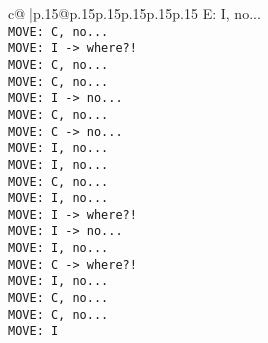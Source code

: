 \documentclass{article}
\begin{document}
{\begin{supertabular}{c@{$\;$}|p{.15\linewidth}@{}p{.15\linewidth}p{.15\linewidth}p{.15\linewidth}p{.15\linewidth}p{.15\linewidth}}
{{{E: I, no...\\ \tt  MOVE: C, no...\\ \tt  MOVE: I -> where?!\\ \tt  MOVE: C, no...\\ \tt  MOVE: C, no...\\ \tt  MOVE: I -> no...\\ \tt  MOVE: C, no...\\ \tt  MOVE: C -> no...\\ \tt  MOVE: I, no...\\ \tt  MOVE: I, no...\\ \tt  MOVE: C, no...\\ \tt  MOVE: I, no...\\ \tt  MOVE: I -> where?!\\ \tt  MOVE: I -> no...\\ \tt  MOVE: I, no...\\ \tt  MOVE: C -> where?!\\ \tt  MOVE: I, no...\\ \tt  MOVE: C, no...\\ \tt  MOVE: C, no...\\ \tt  MOVE: I }}}
\end{supertabular}}
\end{document}
